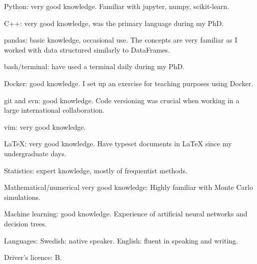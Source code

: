 



\begin{cvskills}


\cvskill
{Python:}
{very good knowledge. Familiar with jupyter, numpy, scikit-learn.}

\cvskill
{C++:}
{very good knowledge, was the primary language during my PhD.}

\cvskill
{pandas:}
{basic knowledge, occasional use. The concepts are very familiar as I worked with data structured \newline similarly to DataFrames.}

\cvskill
{bash/terminal:}
{have used a terminal daily during my PhD.}

\cvskill
{Docker:} 
{good knowledge. I set up an exercise for teaching purposes using Docker.}

\cvskill
{git and svn:}
{good knowledge. Code versioning was crucial when working in a large international collaboration.}

\cvskill
{vim:}
{very good knowledge.}

\cvskill
{LaTeX:}
{very good knowledge. Have typeset documents in LaTeX since my undergraduate days.}

\cvskill
{Statistics:} 
{expert knowledge, mostly of frequentist methods.}

\cvskill
{Mathematical/numerical}{}
{very good knowledge: Highly familiar with Monte Carlo simulations.}

\cvskill
{Machine learning:}
{good knowledge. Experience of artificial neural networks and decision trees.}

\cvskill
{Languages:}
{Swedish: native speaker. English: fluent in speaking and writing.}

\cvskill
{Driver's licence:}
{B.}


\end{cvskills}